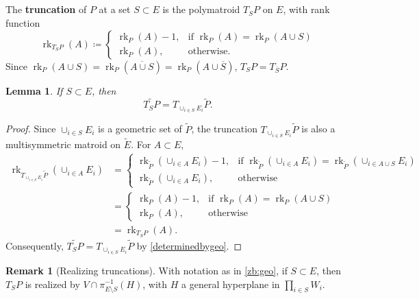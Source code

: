 \documentclass[11pt]{article}
\newtheorem{lemm}[theo]{Lemma}
\theoremstyle{definition}
\newtheorem{rema}[theo]{Remark}
\numberwithin{equation}{section}
\DeclareMathOperator{\rk}{rk}
\newcommand{\word}[1]{\textbf{#1}}
\begin{document}
\subsection{}\label{sec:truncation} The \word{truncation} of $P$ at a set $S \subset E$ is the polymatroid $T_S P$ on $E$, with rank function
\[
  \rk_{T_SP}(A) \coloneqq
  \begin{cases}
    \rk_P(A) - 1, & \text{if $\rk_P(A) = \rk_P(A \cup S)$} \\
    \rk_P(A), & \text{otherwise.}
  \end{cases}
\]
Since $\rk_P(A \cup S) = \rk_P(\overline{A \cup S}) = \rk_P(A \cup \overline S)$, $T_S P = T_{\overline S} P$.
\begin{lemm}\label{truncationcommutes}
  If $S \subset E$, then 
  \[
  \widetilde{T_S P} = T_{\cup_{i \in S} E_i} \widetilde P.
  \]
\end{lemm}
\begin{proof}
    Since $\cup_{i \in S} E_i$ is a geometric set of $\widetilde P$, the truncation $T_{\cup_{i \in S} E_i} \widetilde P$ is also a multisymmetric matroid on $\widetilde E$.
  For $A \subset E$,
\begin{align*}
    \rk_{T_{\cup_{i \in S} E_i} \widetilde P}(\cup_{i \in A} E_i)
    &=
    \begin{cases}
      \rk_{\widetilde P}(\cup_{i \in A} E_i) - 1, & \text{if $\rk_{\widetilde P}(\cup_{i \in A} E_i) = \rk_{\widetilde P}(\cup_{i \in A\cup S} E_i)$} \\
      \rk_{\widetilde P}(\cup_{i \in A} E_i), & \text{otherwise}
    \end{cases} \\
    &= \begin{cases}
      \rk_{P}(A) - 1, & \text{if $\rk_{P}(A) = \rk_{P}(A \cup S)$} \\
      \rk_{P}(A), & \text{otherwise}
      \end{cases}\\
    &= \rk_{T_SP}(A).
\end{align*}
  Consequently, $\widetilde{T_S P} = T_{\cup_{i \in S} E_i} \widetilde P$ by \cref{determinedbygeo}.
\end{proof}
  

\begin{rema}[Realizing truncations]\label{opsgeometry}
  With notation as in \cref{zb:geo}, if $S \subset E$, then $T_S P$ is realized by $V \cap \pi^{-1}_{E \setminus S}(H)$, with $H$ a general hyperplane in $\prod_{i \in S} W_i$.
\end{rema}
\end{document}
